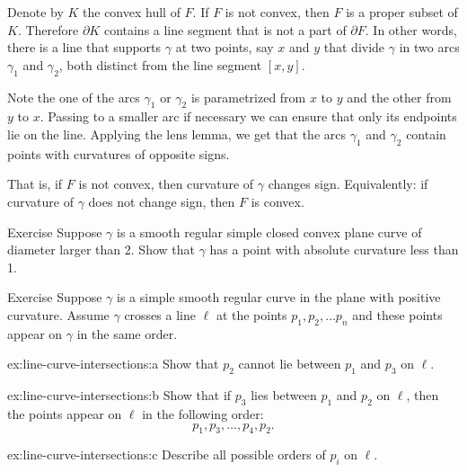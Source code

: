 Denote by $K$ the convex hull of $F$.
If $F$ is not convex, then $F$ is a proper subset of $K$.
Therefore $\partial K$ contains a line segment that is not a part of $\partial F$.
In other words, there is a line that supports $\gamma$ at two points, say $x$ and $y$ that divide $\gamma$ in two arcs $\gamma_1$ and $\gamma_2$, both distinct from the line segment $[x,y]$.

Note the one of the arcs $\gamma_1$ or $\gamma_2$ is parametrized from $x$ to $y$ and the other from $y$ to $x$.
Passing to a smaller arc if necessary we can ensure that only its endpoints lie on the line. 
Applying the lens lemma, we get that the arcs $\gamma_1$ and $\gamma_2$ contain points with curvatures of opposite signs.

That is, if $F$ is not convex, then curvature of $\gamma$ changes sign.
Equivalently: if curvature of $\gamma$ does not change sign, then $F$ is convex.
\qeds

\begin{thm}{Exercise}\label{ex:convex small}
Suppose $\gamma$ is a smooth regular simple closed convex plane curve of diameter larger than 2.
Show that $\gamma$ has a point with absolute curvature less than 1.
\end{thm}

\begin{thm}{Exercise}\label{ex:line-curve-intersections}
Suppose $\gamma$ is a simple smooth regular curve in the plane with positive curvature.
Assume $\gamma$ crosses a line $\ell$ at the points $p_1,p_2,\dots p_n$ and these points appear on $\gamma$ in the same order.

\begin{subthm}{ex:line-curve-intersections:a} Show that $p_2$ cannot lie between $p_1$ and $p_3$ on $\ell$.
\end{subthm}

\begin{subthm}{ex:line-curve-intersections:b} Show that if $p_3$ lies between $p_1$ and $p_2$ on $\ell$, then the points appear on $\ell$ in the following order:  
\[p_1,p_3,\dots,p_4 ,p_2.\]

\end{subthm}

\begin{subthm}{ex:line-curve-intersections:c}
Describe all possible orders of $p_i$ on $\ell$.

\end{subthm}

\end{thm}

